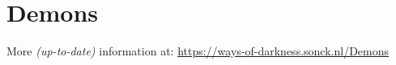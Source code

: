 \section{Demons}
More \textit{(up-to-date)} information at: \url{https://ways-of-darkness.sonck.nl/Demons}


